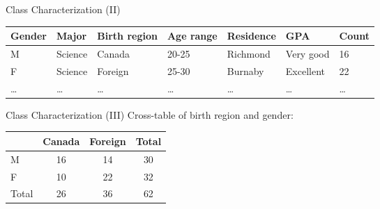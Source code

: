 \begin{frame}{Class Characterization (II)}
	\begin{table}
		\begin{tabularx}{\textwidth}{|X|X|X|X|X|X|X|}
			\hline
			\textbf{Gender} & \textbf{Major} & \textbf{Birth region} & \textbf{Age range} & \textbf{Residence} & \textbf{GPA} & \textbf{Count} \\\hline
			M               & Science        & Canada                & 20-25              & Richmond           & Very good    & 16             \\\hline
			F               & Science        & Foreign               & 25-30              & Burnaby            & Excellent    & 22             \\\hline
			\ldots          & \ldots         & \ldots                & \ldots             & \ldots             & \ldots       & \ldots         \\
			\hline
		\end{tabularx}
	\end{table}
\end{frame}

\begin{frame}{Class Characterization (III)}
	\centering
	Cross-table of birth region and gender:\\[0.5cm]
	\begin{tabular}{|l|c|c|c|}
		\hline
		      & Canada & Foreign & Total \\\hline
		M     & 16     & 14      & 30    \\\hline
		F     & 10     & 22      & 32    \\\hline
		Total & 26     & 36      & 62    \\\hline
	\end{tabular}
\end{frame}

